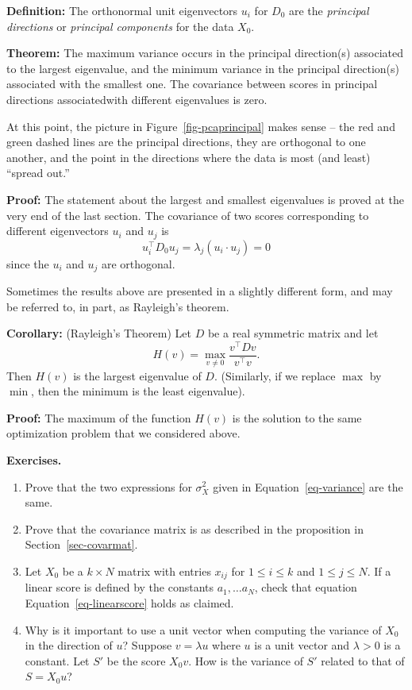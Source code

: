 \documentclass[
  11pt,
  letterpaper,
]{scrbook}
\theoremstyle{plain}
\theoremstyle{remark}
\begin{document}
\textbf{Definition:} The orthonormal unit eigenvectors \(u_{i}\) for
\(D_{0}\) are the \emph{principal directions} or \emph{principal
components} for the data \(X_{0}\).

\textbf{Theorem:} The maximum variance occurs in the principal
direction(s) associated to the largest eigenvalue, and the minimum
variance in the principal direction(s) associated with the smallest one.
The covariance between scores in principal directions associatedwith
different eigenvalues is zero.

At this point, the picture in Figure~\ref{fig-pcaprincipal} makes sense
-- the red and green dashed lines are the principal directions, they are
orthogonal to one another, and the point in the directions where the
data is most (and least) ``spread out.''

\textbf{Proof:} The statement about the largest and smallest eigenvalues
is proved at the very end of the last section. The covariance of two
scores corresponding to different eigenvectors \(u_{i}\) and \(u_{j}\)
is \[u_{i}^{\intercal}D_{0}u_{j} = \lambda_{j}(u_{i}\cdot u_{j}) = 0\]
since the \(u_{i}\) and \(u_{j}\) are orthogonal.

Sometimes the results above are presented in a slightly different form,
and may be referred to, in part, as Rayleigh's theorem.

\textbf{Corollary:} (Rayleigh's Theorem) Let \(D\) be a real symmetric
matrix and let \[
H(v) = \max_{v\not = 0}\frac{v^{\intercal}Dv}{v^{\intercal}v}.
\] Then \(H(v)\) is the largest eigenvalue of \(D\). (Similarly, if we
replace \(\max\) by \(\min\), then the minimum is the least eigenvalue).

\textbf{Proof:} The maximum of the function \(H(v)\) is the solution to
the same optimization problem that we considered above.

\textbf{Exercises.}

\begin{enumerate}
\def\labelenumi{\arabic{enumi}.}
\item
  Prove that the two expressions for \(\sigma_{X}^2\) given in
  Equation~\ref{eq-variance} are the same.
\item
  Prove that the covariance matrix is as described in the proposition in
  Section~\ref{sec-covarmat}.
\item
  Let \(X_{0}\) be a \(k\times N\) matrix with entries \(x_{ij}\) for
  \(1\le i\le k\) and \(1\le j\le N\). If a linear score is defined by
  the constants \(a_{1},\ldots a_{N}\), check that equation
  Equation~\ref{eq-linearscore} holds as claimed.
\item
  Why is it important to use a unit vector when computing the variance
  of \(X_{0}\) in the direction of \(u\)? Suppose \(v=\lambda u\) where
  \(u\) is a unit vector and \(\lambda>0\) is a constant. Let \(S'\) be
  the score \(X_{0}v\). How is the variance of \(S'\) related to that of
  \(S=X_{0}u\)?
\end{enumerate}
\end{document}
